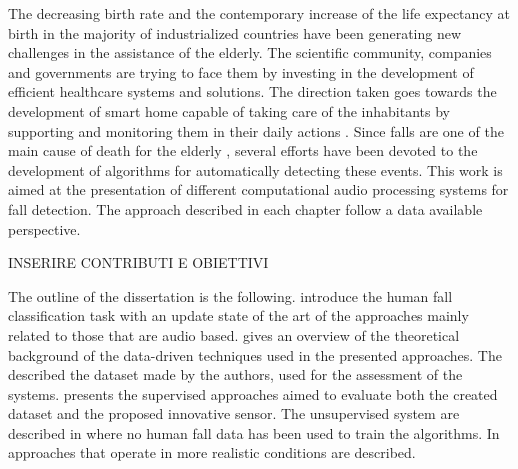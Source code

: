 The decreasing birth rate \cite{eurostat} and the contemporary increase of the life expectancy at birth \cite{Carone2006} in the majority of industrialized countries have been generating new challenges in the assistance of the elderly. The scientific community, companies and governments are trying to face them by investing in the development of efficient healthcare systems and solutions. The direction taken goes towards the development of smart home capable of taking care of the inhabitants by supporting and monitoring them in their daily actions \cite{Dawadi20161188, Principi2015a}. Since falls are one of the main cause of death for the elderly \cite{mubashir2013survey}, several efforts have been devoted to the development of algorithms for automatically detecting these events.
This work is aimed at the presentation of different computational audio processing systems for fall detection. The approach described in each chapter follow a data available perspective. 

INSERIRE CONTRIBUTI E OBIETTIVI

The outline of the dissertation is the following.
 introduce the human fall classification task with an update state of the art of the approaches mainly related to those that are audio based.  gives an overview of the theoretical background of the data-driven techniques used in the presented approaches. The  described the dataset made by the authors, used for the assessment of the systems.  presents the supervised approaches aimed to evaluate both the created dataset and the proposed innovative sensor.
The unsupervised system are described in  where no human fall data has been used to train the algorithms.
In  approaches that operate in more realistic conditions are described.





